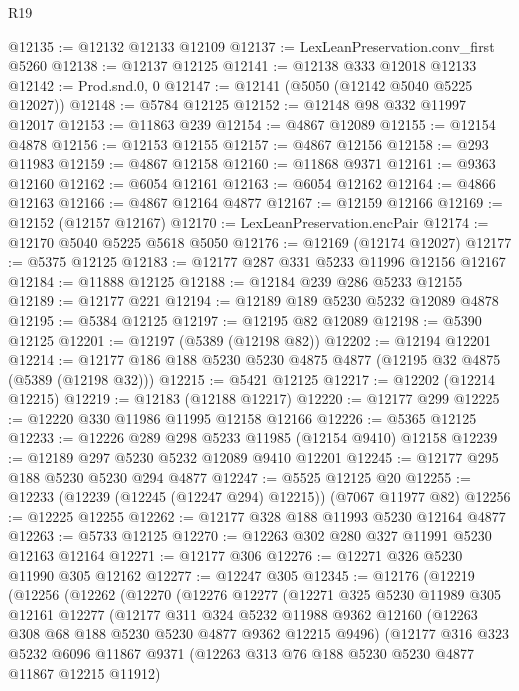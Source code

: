 \begin{lexlean}{R19}
\begin{coremodule}
@12135 := @12132 @12133 @12109
@12137 := LexLeanPreservation.conv_first @5260
@12138 := @12137 @12125
@12141 := @12138 @333 @12018 @12133
@12142 := Prod.snd.{0, 0}
@12147 := @12141 (@5050 (@12142 @5040 @5225 @12027))
@12148 := @5784 @12125
@12152 := @12148 @98 @332 @11997 @12017
@12153 := @11863 @239
@12154 := @4867 @12089
@12155 := @12154 @4878
@12156 := @12153 @12155
@12157 := @4867 @12156
@12158 := @293 @11983
@12159 := @4867 @12158
@12160 := @11868 @9371
@12161 := @9363 @12160
@12162 := @6054 @12161
@12163 := @6054 @12162
@12164 := @4866 @12163
@12166 := @4867 @12164 @4877
@12167 := @12159 @12166
@12169 := @12152 (@12157 @12167)
@12170 := LexLeanPreservation.encPair
@12174 := @12170 @5040 @5225 @5618 @5050
@12176 := @12169 (@12174 @12027)
@12177 := @5375 @12125
@12183 := @12177 @287 @331 @5233 @11996 @12156 @12167
@12184 := @11888 @12125
@12188 := @12184 @239 @286 @5233 @12155
@12189 := @12177 @221
@12194 := @12189 @189 @5230 @5232 @12089 @4878
@12195 := @5384 @12125
@12197 := @12195 @82 @12089
@12198 := @5390 @12125
@12201 := @12197 (@5389 (@12198 @82))
@12202 := @12194 @12201
@12214 := @12177 @186 @188 @5230 @5230 @4875 @4877 (@12195 @32 @4875 (@5389 (@12198 @32)))
@12215 := @5421 @12125
@12217 := @12202 (@12214 @12215)
@12219 := @12183 (@12188 @12217)
@12220 := @12177 @299
@12225 := @12220 @330 @11986 @11995 @12158 @12166
@12226 := @5365 @12125
@12233 := @12226 @289 @298 @5233 @11985 (@12154 @9410) @12158
@12239 := @12189 @297 @5230 @5232 @12089 @9410 @12201
@12245 := @12177 @295 @188 @5230 @5230 @294 @4877
@12247 := @5525 @12125 @20
@12255 := @12233 (@12239 (@12245 (@12247 @294) @12215)) (@7067 @11977 @82)
@12256 := @12225 @12255
@12262 := @12177 @328 @188 @11993 @5230 @12164 @4877
@12263 := @5733 @12125
@12270 := @12263 @302 @280 @327 @11991 @5230 @12163 @12164
@12271 := @12177 @306
@12276 := @12271 @326 @5230 @11990 @305 @12162
@12277 := @12247 @305
@12345 := @12176
    (@12219
      (@12256
        (@12262
          (@12270
            (@12276
              @12277
              (@12271
                @325
                @5230
                @11989
                @305
                @12161
                @12277
                (@12177
                  @311
                  @324
                  @5232
                  @11988
                  @9362
                  @12160
                  (@12263 @308 @68 @188 @5230 @5230 @4877 @9362 @12215 @9496)
                  (@12177
                    @316
                    @323
                    @5232
                    @6096
                    @11867
                    @9371
                    (@12263 @313 @76 @188 @5230 @5230 @4877 @11867 @12215 @11912)

\end{coremodule}
\end{lexlean}
